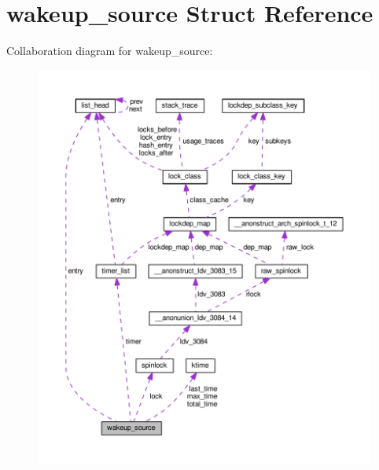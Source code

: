 \hypertarget{structwakeup__source}{}\section{wakeup\+\_\+source Struct Reference}
\label{structwakeup__source}


Collaboration diagram for wakeup\+\_\+source\+:
\nopagebreak
\begin{figure}[H]
\begin{center}
\leavevmode
\includegraphics[width=350pt]{structwakeup__source__coll__graph}
\end{center}
\end{figure}
